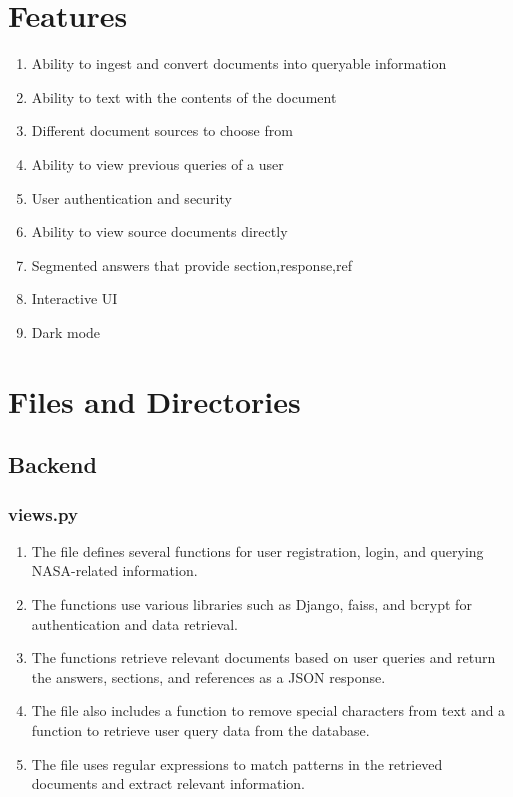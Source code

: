 \documentclass[11pt]{article}
\begin{document}
\section{Features}
\begin{enumerate}
	\item Ability to ingest and convert documents into queryable information
	\item Ability to text with the contents of the document
	\item Different document sources to choose from
	\item Ability to view previous queries of a user
	\item User authentication and security
	\item Ability to view source documents directly
	\item Segmented answers that provide section,response,ref
	\item Interactive UI
	\item Dark mode
\end{enumerate}

\section{Files and Directories}

\subsection{Backend}
\subsubsection{views.py}

\begin{enumerate}
	\item The file defines several functions for user registration, login, and querying NASA-related information.
	\item The functions use various libraries such as Django, faiss, and bcrypt for authentication and data retrieval.
	\item The functions retrieve relevant documents based on user queries and return the answers, sections, and references as a JSON response.
	\item The file also includes a function to remove special characters from text and a function to retrieve user query data from the database.
	\item The file uses regular expressions to match patterns in the retrieved documents and extract relevant information.
\end{enumerate}
\end{document}
